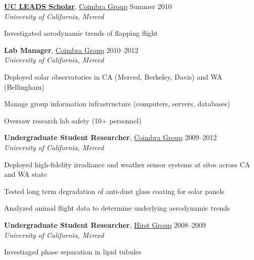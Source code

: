 \documentclass[10pt]{article}
\newcommand{\blankline}{\quad\pagebreak[3]}
\begin{document}
\blankline


\textbf{\href{http://graduatedivision.ucmerced.edu/grad-prep-programs/uc-leads}{UC LEADS Scholar}}, \href{http://coimbra.ucsd.edu/}{Coimbra Group} \hfill Summer 2010 \\
\textit{University of California, Merced}
\begin{innerlist}
    \item Investigated aerodynamic trends of flapping flight
\end{innerlist}


\blankline


\textbf{Lab Manager}, \href{http://coimbra.ucsd.edu/}{Coimbra Group} \hfill 2010--2012 \\
\textit{University of California, Merced}
\begin{innerlist}
    \item Deployed solar observatories in CA (Merced, Berkeley, Davis) and WA (Bellingham)
    \item Manage group information infrastructure (computers, servers, databases)
    \item Oversaw research lab safety (10+ personnel)
\end{innerlist}


\blankline


\textbf{Undergraduate Student Researcher}, \href{http://coimbra.ucsd.edu/}{Coimbra Group} \hfill 2009--2012 \\
\textit{University of California, Merced}
\begin{innerlist}
    \item Deployed high-fidelity irradiance and weather sensor systems at sites across CA and WA state
    \item Tested long term degradation of anti-dust glass coating for solar panels
    \item Analyzed animal flight data to determine underlying aerodynamic trends
\end{innerlist}


\blankline


\textbf{Undergraduate Student Researcher}, \href{http://faculty.ucmerced.edu/lhirst/}{Hirst Group} \hfill 2008--2009 \\
\textit{University of California, Merced}
\begin{innerlist}
    \item Investiaged phase separation in lipid tubules
\end{innerlist}


\blankline
\end{document}
